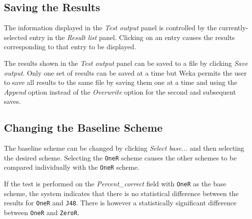 \documentclass[a4paper]{article}
\begin{document}
\begin{center}
\end{center}


\subsection{Saving the Results}

The information displayed in the \textit{Test output} panel is controlled by the currently-selected entry in the \textit{Result list} panel. Clicking on an entry causes the results corresponding to that entry to be displayed.
\begin{center}
\end{center}

The results shown in the \textit{Test output} panel can be saved to a file by clicking \textit{Save output}. Only one set of results can be saved at a time but Weka permits the user to save all results to the same file by saving them one at a time and using the \textit{Append} option instead of the \textit{Overwrite} option for the second and subsequent saves.
\begin{center}
\end{center}


\subsection{Changing the Baseline Scheme}

The baseline scheme can be changed by clicking \textit{Select base...} and then selecting the desired scheme. Selecting the \texttt{OneR} scheme causes the other schemes to be compared individually with the \texttt{OneR} scheme.
\begin{center}
\end{center}

If the test is performed on the \textit{Percent\_correct} field with \texttt{OneR} as the base scheme, the system indicates that there is no statistical difference between the results for \texttt{OneR} and \texttt{J48}. There is however a statistically significant difference between \texttt{OneR} and \texttt{ZeroR}.
\begin{center}
\end{center}
\end{document}
